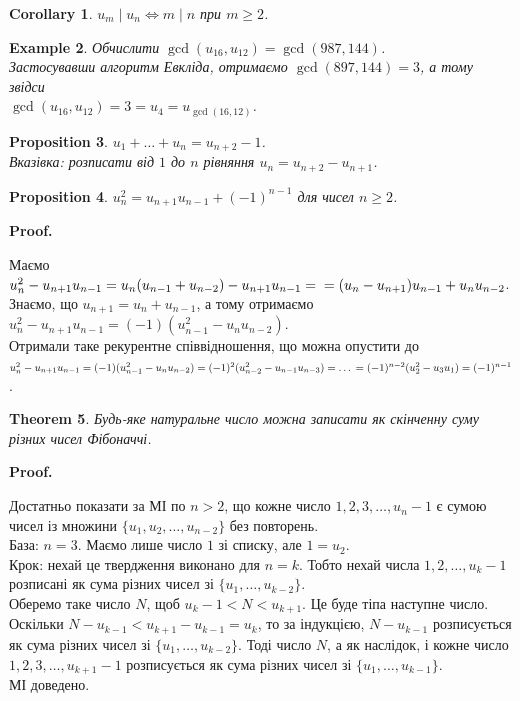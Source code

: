 \documentclass[a4paper, 10pt]{article}
\makeatletter
\theoremstyle{theoremdd}
\newtheorem{theorem}{Theorem}[subsection]
\theoremstyle{theoremdd}
\theoremstyle{theoremdd}
\theoremstyle{theoremdd}
\newtheorem{example}[theorem]{Example}
\theoremstyle{theoremdd}
\newtheorem{proposition}[theorem]{Proposition}
\theoremstyle{theoremdd}
\theoremstyle{theoremdd}
\theoremstyle{theoremdd}
\newtheorem{corollary}[theorem]{Corollary}
\renewenvironment{proof}[1][Proof.\\]{\par
\pushQED{\hfill \qed}%
\normalfont \topsep6\p@\@plus6\p@\relax
\trivlist
\item\relax
{\bfseries
#1\@addpunct{.}}\hspace\labelsep\ignorespaces
}{%
\popQED\endtrivlist\@endpefalse
}
\makeatother
\begin{document}
\begin{corollary}
$u_m \mid u_n \iff m \mid n$ при $m \geq 2$.
\end{corollary}

\begin{example}
Обчислити $\gcd(u_{16},u_{12}) = \gcd(987,144)$.\\
Застосувавши алгоритм Евкліда, отримаємо $\gcd(897,144) = 3$, а тому звідси\\
$\gcd(u_{16},u_{12}) = 3 = u_4 = u_{\gcd(16,12)}$.
\end{example}

\begin{proposition}
$u_1 + \dots + u_n = u_{n+2} - 1$.\\
\textit{Вказівка: розписати від $1$ до $n$ рівняння $u_{n} = u_{n+2} - u_{n+1}$.}
\end{proposition}

\begin{proposition}
$u_n^2 = u_{n+1}u_{n-1} + (-1)^{n-1}$ для чисел $n \geq 2$.
\end{proposition}

\begin{proof}
Маємо\\
$u_n^2 - u_{n+1}u_{n-1} = u_n (u_{n-1}+u_{n-2}) - u_{n+1}u_{n-1} = \\
= (u_n-u_{n+1})u_{n-1}+u_nu_{n-2}$.\\
Знаємо, що $u_{n+1} = u_n + u_{n-1}$, а тому отримаємо\\
$u_n^2 - u_{n+1}u_{n-1} = (-1)(u_{n-1}^2-u_n u_{n-2})$.\\
Отримали таке рекурентне співвідношення, що можна опустити до\\
$u_n^2 - u_{n+1}u_{n-1} = (-1)(u_{n-1}^2-u_n u_{n-2}) = (-1)^2 (u_{n-2}^2-u_{n-1} u_{n-3}) = \dots \\
= (-1)^{n-2} (u_2^2-u_3u_1) = (-1)^{n-1}$.
\end{proof}

\begin{theorem}
Будь-яке натуральне число можна записати як скінченну суму різних чисел Фібоначчі.
\end{theorem}

\begin{proof}
Достатньо показати за МІ по $n > 2$, що кожне число $1,2,3,\dots,u_n-1$ є сумою чисел із множини $\{u_1,u_2,\dots,u_{n-2}\}$ без повторень.\\
База: $n = 3$. Маємо лише число $1$ зі списку, але $1 = u_2$.\\
Крок: нехай це твердження виконано для $n = k$. Тобто нехай числа $1,2,\dots,u_{k}-1$ розписані як сума різних чисел зі $\{u_1,\dots,u_{k-2}\}$.\\ Оберемо таке число $N$, щоб $u_k-1 < N < u_{k+1}$. Це буде тіпа наступне число.\\
Оскільки $N-u_{k-1} < u_{k+1}-u_{k-1} = u_k$, то за індукцією, $N-u_{k-1}$ розписується як сума різних чисел зі $\{u_1,\dots,u_{k-2}\}$. Тоді число $N$, а як наслідок, і кожне число $1,2,3,\dots,u_{k+1}-1$ розписується як сума різних чисел зі $\{u_1,\dots,u_{k-1}\}$.\\
МІ доведено.
\end{proof}
\end{document}
